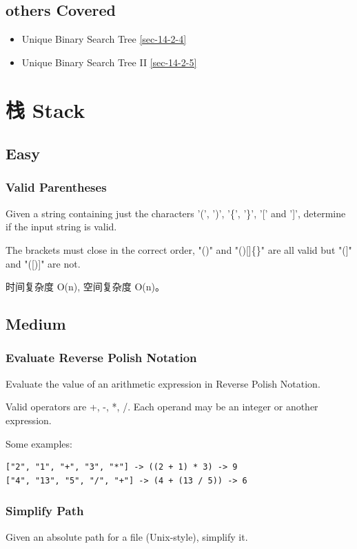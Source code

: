 \documentclass[12pt]{book}
\begin{document}
\section{others Covered}
\label{sec-4-6}
\begin{itemize}
\item Unique Binary Search Tree
\ref{sec-14-2-4}
\item Unique Binary Search Tree II
\ref{sec-14-2-5}
\end{itemize}

\chapter{栈 Stack}
\label{sec-5}
\section{Easy}
\label{sec-5-1}
\subsection{Valid Parentheses}
\label{sec-5-1-1}
Given a string containing just the characters '(', ')', '\{', '\}', '[' and ']', determine if the input string is valid.

The brackets must close in the correct order, "()" and "()[]\{\}" are all valid but "(]" and "([)]" are not.

时间复杂度 O(n), 空间复杂度 O(n)。

\section{Medium}
\label{sec-5-2}
\subsection{Evaluate Reverse Polish Notation}
\label{sec-5-2-1}
Evaluate the value of an arithmetic expression in Reverse Polish Notation.

Valid operators are +, -, *, /. Each operand may be an integer or another expression.

Some examples:
\lstset{language=java,label= ,caption= ,numbers=none}
\begin{lstlisting}
["2", "1", "+", "3", "*"] -> ((2 + 1) * 3) -> 9
["4", "13", "5", "/", "+"] -> (4 + (13 / 5)) -> 6
\end{lstlisting}

\subsection{Simplify Path}
\label{sec-5-2-2}
Given an absolute path for a file (Unix-style), simplify it.
\end{document}
